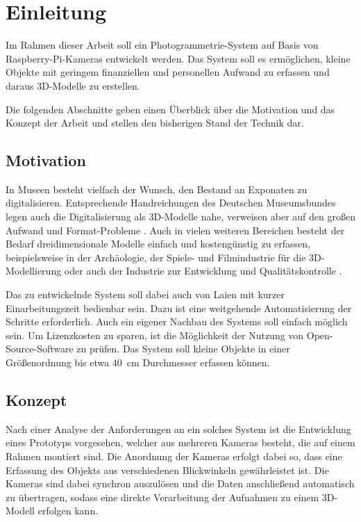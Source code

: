 \documentclass[./00PhotoBox]{subfiles}
\begin{document}
\chapter{Einleitung}
\label{c:einleitung}

Im Rahmen dieser Arbeit soll ein Photogrammetrie-System auf Basis von Raspberry-Pi-Kameras entwickelt werden. Das System soll es ermöglichen, kleine Objekte mit geringem finanziellen und personellen Aufwand zu erfassen und daraus 3D-Modelle zu erstellen.

Die folgenden Abschnitte geben einen Überblick über die Motivation und das Konzept der Arbeit und stellen den bisherigen Stand der Technik dar.

\section{Motivation}

In Museen besteht vielfach der Wunsch, den Bestand an Exponaten zu digitalisieren. Entsprechende Handreichungen des Deutschen Museumsbundes legen auch die Digitalisierung als 3D-Modelle nahe, verweisen aber auf den großen Aufwand und Format-Probleme \citep[S. 43]{handreichung_digital}.
Auch in vielen weiteren Bereichen besteht der Bedarf dreidimensionale Modelle einfach und kostengünstig zu erfassen, beispielsweise in der Archäologie, der Spiele- und Filmindustrie für die 3D-Modellierung oder auch der Industrie zur Entwicklung und Qualitätskontrolle \citep[S. 37f]{luhmann}.

Das zu entwickelnde System soll dabei auch von Laien mit kurzer Einarbeitungszeit bedienbar sein. Dazu ist eine weitgehende Automatisierung der Schritte erforderlich. Auch ein eigener Nachbau des Systems soll einfach möglich sein. Um Lizenzkosten zu sparen, ist die Möglich\-keit der Nutzung von Open-Source-Software zu prüfen. Das System soll kleine Objekte in einer Größenordnung bis etwa \SI{40}{\centi\metre} Durchmesser erfassen können.

\section{Konzept}
Nach einer Analyse der Anforderungen an ein solches System ist die Entwicklung eines Prototyps vorgesehen, welcher aus mehreren Kameras besteht, die auf einem Rahmen montiert sind. Die Anordnung der Kameras erfolgt dabei so, dass eine Erfassung des Objekts aus verschiedenen Blickwinkeln gewährleistet ist. Die Kameras sind dabei synchron auszulösen und die Daten anschließend automatisch zu übertragen, sodass eine direkte Verarbeitung der Aufnahmen zu einem 3D-Modell erfolgen kann.
\end{document}
